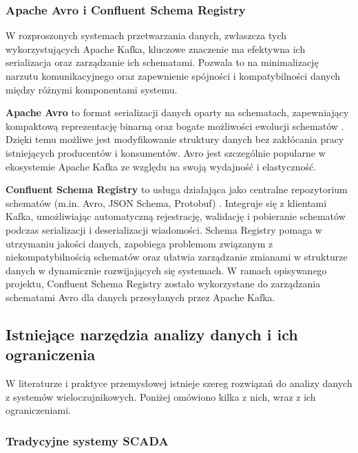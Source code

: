 \subsubsection{Apache Avro i Confluent Schema Registry}
\label{subsubsec:avro_schema_registry}

W rozproszonych systemach przetwarzania danych, zwłaszcza tych wykorzystujących Apache Kafka, kluczowe znaczenie ma efektywna ich serializacja oraz zarządzanie ich schematami. Pozwala to na minimalizację narzutu komunikacyjnego oraz zapewnienie spójności i kompatybilności danych między różnymi komponentami systemu.

\textbf{Apache Avro} to format serializacji danych oparty na schematach, zapewniający kompaktową reprezentację binarną oraz bogate możliwości ewolucji schematów \cite{avro_documentation}. Dzięki temu możliwe jest modyfikowanie struktury danych bez zakłócania pracy istniejących producentów i konsumentów. Avro jest szczególnie popularne w ekosystemie Apache Kafka ze względu na swoją wydajność i elastyczność.

\textbf{Confluent Schema Registry} to usługa działająca jako centralne repozytorium schematów (m.in. Avro, JSON Schema, Protobuf) \cite{confluent_schema_registry}. Integruje się z klientami Kafka, umożliwiając automatyczną rejestrację, walidację i pobieranie schematów podczas serializacji i deserializacji wiadomości. Schema Registry pomaga w utrzymaniu jakości danych, zapobiega problemom związanym z niekompatybilnością schematów oraz ułatwia zarządzanie zmianami w strukturze danych w dynamicznie rozwijających się systemach. W ramach opisywanego projektu, Confluent Schema Registry zostało wykorzystane do zarządzania schematami Avro dla danych przesyłanych przez Apache Kafka.

\subsection{Istniejące narzędzia analizy danych i ich ograniczenia}
\label{subsec:istniejace_rozwiazania}

W literaturze i praktyce przemysłowej istnieje szereg rozwiązań do analizy danych z systemów wieloczujnikowych. Poniżej omówiono kilka z nich, wraz z ich ograniczeniami.

\subsubsection{Tradycyjne systemy SCADA}
\label{subsubsec:scada}

